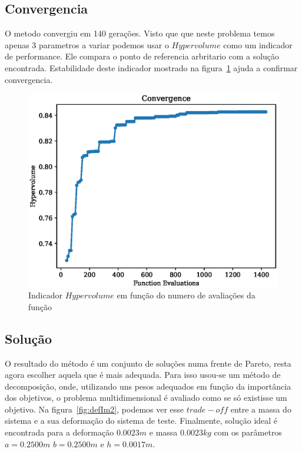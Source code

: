 \documentclass[a4paper,12pt]{article}
\begin{document}
\subsection{Convergencia}

O metodo convergiu em 140 gerações. Visto que que neste problema temos apenas 3 parametros a variar podemos usar o $Hypervolume$ como um indicador de performance. Ele compara o ponto de referencia arbritario com a solução encontrada. Estabilidade deste indicador mostrado na figura~\ref{fig:hyper} ajuda a confirmar convergencia.


\begin{figure}[h]
\begin{center}
\includegraphics[scale=0.7]{convergence.eps}
\end{center}
\caption{Indicador $Hypervolume$ em função do numero de avaliações da função}
\label{fig:hyper}
\end{figure}

\subsection{Solução}

O resultado do método é um conjunto de soluções numa frente de Pareto, resta agora escolher aquela que é mais adequada. Para isso usou-se um método de decomposição, onde, utilizando uns pesos adequados em função da importância dos objetivos, o problema multidimensional é avaliado como se só existisse um objetivo. Na figura~\ref{fig:defIm2}, podemos ver esse $trade-off$ entre a massa do sistema e a sua deformação do sistema de teste.
Finalmente, solução ideal é encontrada para a deformação $0.0023m$ e massa $0.0023kg$ com os parâmetros $a=0.2500m$ $b=0.2500m$ e $h=0.0017m$.
\end{document}

